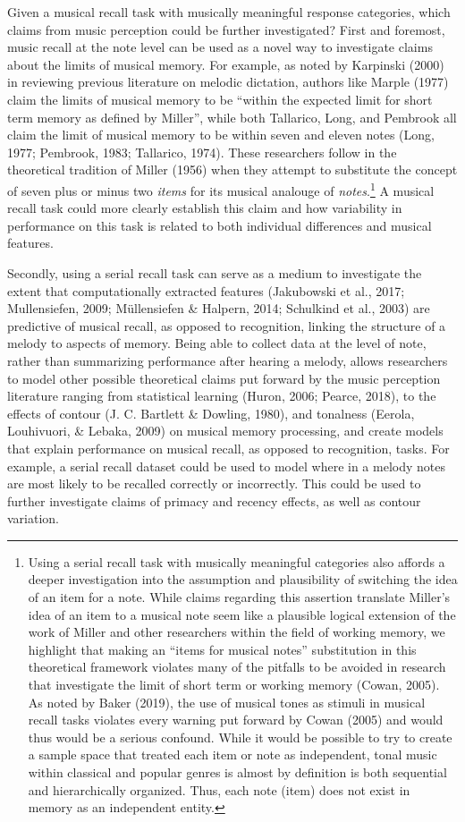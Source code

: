 \documentclass[english,man,floatsintext]{apa6}
\begin{document}
Given a musical recall task with musically meaningful response categories, which claims from music perception could be further investigated?
First and foremost, music recall at the note level can be used as a novel way to investigate claims about the limits of musical memory.
For example, as noted by Karpinski (2000) in reviewing previous literature on melodic dictation, authors like Marple (1977) claim the limits of musical memory to be \enquote{within the expected limit for short term memory as defined by Miller}, while both Tallarico, Long, and Pembrook all claim the limit of musical memory to be within seven and eleven notes (Long, 1977; Pembrook, 1983; Tallarico, 1974).
These researchers follow in the theoretical tradition of Miller (1956) when they attempt to substitute the concept of seven plus or minus two \emph{items} for its musical analouge of \emph{notes}.\footnote{Using a serial recall task with musically meaningful categories also affords a deeper investigation into the assumption and plausibility of switching the idea of an item for a note. While claims regarding this assertion translate Miller's idea of an item to a musical note seem like a plausible logical extension of the work of Miller and other researchers within the field of working memory, we highlight that making an ``items for musical notes'' substitution in this theoretical framework violates many of the pitfalls to be avoided in research that investigate the limit of short term or working memory (Cowan, 2005). As noted by Baker (2019), the use of musical tones as stimuli in musical recall tasks violates every warning put forward by Cowan (2005) and would thus would be a serious confound. While it would be possible to try to create a sample space that treated each item or note as independent, tonal music within classical and popular genres is almost by definition is both sequential and hierarchically organized. Thus, each note (item) does not exist in memory as an independent entity.}
A musical recall task could more clearly establish this claim and how variability in performance on this task is related to both individual differences and musical features.

Secondly, using a serial recall task can serve as a medium to investigate the extent that computationally extracted features (Jakubowski et al., 2017; Mullensiefen, 2009; Müllensiefen \& Halpern, 2014; Schulkind et al., 2003) are predictive of musical recall, as opposed to recognition, linking the structure of a melody to aspects of memory.
Being able to collect data at the level of note, rather than summarizing performance after hearing a melody, allows researchers to model other possible theoretical claims put forward by the music perception literature ranging from statistical learning (Huron, 2006; Pearce, 2018), to the effects of contour (J. C. Bartlett \& Dowling, 1980), and tonalness (Eerola, Louhivuori, \& Lebaka, 2009) on musical memory processing, and create models that explain performance on musical recall, as opposed to recognition, tasks.
For example, a serial recall dataset could be used to model where in a melody notes are most likely to be recalled correctly or incorrectly.
This could be used to further investigate claims of primacy and recency effects, as well as contour variation.
\end{document}
